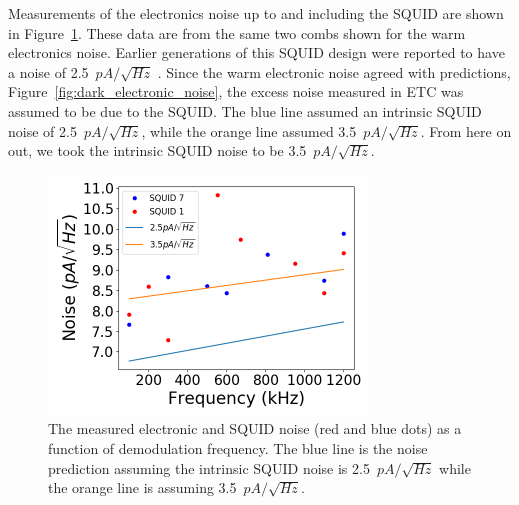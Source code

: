 Measurements of the electronics noise up to and including the \ac{SQUID} are shown in Figure~\ref{fig:adjust_squid}.
These data are from the same two combs shown for the warm electronics noise. 
Earlier generations of this \ac{SQUID} design were reported to have a noise of 2.5~$pA/\sqrt{Hz}$ \cite{Huber2001}.
Since the warm electronic noise agreed with predictions, Figure~\ref{fig:dark_electronic_noise}, the excess noise measured in \ac{ETC} was assumed to be due to the \ac{SQUID}. 
The blue line assumed an intrinsic \ac{SQUID} noise of 2.5~$pA/\sqrt{Hz}$, while the orange line assumed 3.5~$pA/\sqrt{Hz}$.
From here on out, we took the intrinsic \ac{SQUID} noise to be 3.5~$pA/\sqrt{Hz}$.

\begin{figure}[ht!]
\begin{center}
\includegraphics[height=2.5in]{figures/adjusting_squid_noise.png}
\caption{The measured electronic and \ac{SQUID} noise (red and blue dots) as a function of demodulation frequency. The blue line is the noise prediction assuming the intrinsic \ac{SQUID} noise is 2.5~$pA/\sqrt{Hz}$ while the orange line is assuming 3.5~$pA/\sqrt{Hz}$.  
\label{fig:adjust_squid} }
\end{center}
\end{figure}







